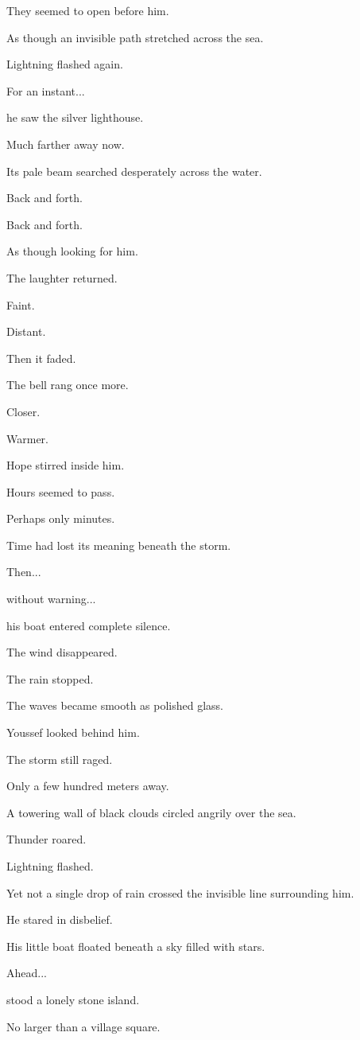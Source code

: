 \documentclass[12pt,openany]{book}
\begin{document}
They seemed to open before him.

As though an invisible path stretched across the sea.

Lightning flashed again.

For an instant...

he saw the silver lighthouse.

Much farther away now.

Its pale beam searched desperately across the water.

Back and forth.

Back and forth.

As though looking for him.

The laughter returned.

Faint.

Distant.

Then it faded.

The bell rang once more.

Closer.

Warmer.

Hope stirred inside him.

Hours seemed to pass.

Perhaps only minutes.

Time had lost its meaning beneath the storm.

Then...

without warning...

his boat entered complete silence.

The wind disappeared.

The rain stopped.

The waves became smooth as polished glass.

Youssef looked behind him.

The storm still raged.

Only a few hundred meters away.

A towering wall of black clouds circled angrily over the sea.

Thunder roared.

Lightning flashed.

Yet not a single drop of rain crossed the invisible line surrounding him.

He stared in disbelief.

His little boat floated beneath a sky filled with stars.

Ahead...

stood a lonely stone island.

No larger than a village square.
\end{document}
